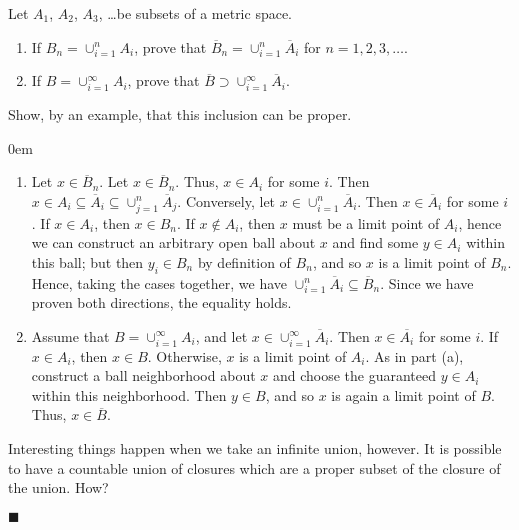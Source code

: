 \documentclass[12pt]{article}
\renewcommand{\qed}{\hfill$\blacksquare$}
\renewenvironment{proof}{\begin{addmargin}[1em]{0em}\begin{newproof}}{\end{newproof}\end{addmargin}\qed}
\newenvironment{problem}[2][Exercise]{\begin{trivlist}
\item[\hskip \labelsep {\bfseries #1}\hskip \labelsep {\bfseries #2.}]}{\end{trivlist}}
\begin{document}
\begin{problem}{2.7}
Let $A_1$, $A_2$, $A_3$, \ldots be subsets of a metric space.
\begin{enumerate}[label=(\alph*)]
	\item If $B_n = \cup_{i=1}^n A_i$, prove that $\overline{B}_n = \cup_{i=1}^n \overline{A}_i$ for $n=1,2,3,\ldots$.
	\item If $B = \cup_{i=1}^{\infty} A_i$, prove that $\overline{B} \supset \cup_{i=1}^{\infty} \overline{A}_i$.
\end{enumerate}
Show, by an example, that this inclusion can be proper.
\end{problem}

\begin{proof}
\begin{enumerate}[label=(\alph*)]
	\item Let $x \in \overline{B}_n$. Let $x\in \overline{B}_n$. Thus, $x\in A_i$ for some $i$. Then $x \in A_i \subseteq \overline{A}_i \subseteq \cup_{j=1}^n \overline{A}_j $. Conversely, let $x \in \cup_{i=1}^n \overline{A}_i$. Then $x\in \overline{A}_i$ for some $i$. If $x \in A_i$, then $x\in B_n$. If $x \notin A_i$, then $x$ must be a limit point of $A_i$, hence we can construct an arbitrary open ball about $x$ and find some $y\in A_i$ within this ball; but then $y_i \in B_n$ by definition of $B_n$, and so $x$ is a limit point of $B_n$. Hence, taking the cases together, we have $\cup_{i=1}^n \overline{A}_i \subseteq \overline{B}_n$. Since we have proven both directions, the equality holds.
	\item Assume that $B = \cup_{i=1}^{\infty} A_i$, and let $x \in \cup_{i=1}^{\infty} \overline{A}_i$. Then $x \in \overline{A_i}$ for some $i$. If $x \in A_i$, then $x \in B$. Otherwise, $x$ is a limit point of $A_i$. As in part (a), construct a ball neighborhood about $x$ and choose the guaranteed $y\in A_i$ within this neighborhood. Then $y \in B$, and so $x$ is again a limit point of $B$. Thus, $x \in \overline{B}$.
\end{enumerate}


Interesting things happen when we take an infinite union, however. It is possible to have a countable union of closures which are a proper subset of the closure of the union. How?
\end{proof}
\end{document}
